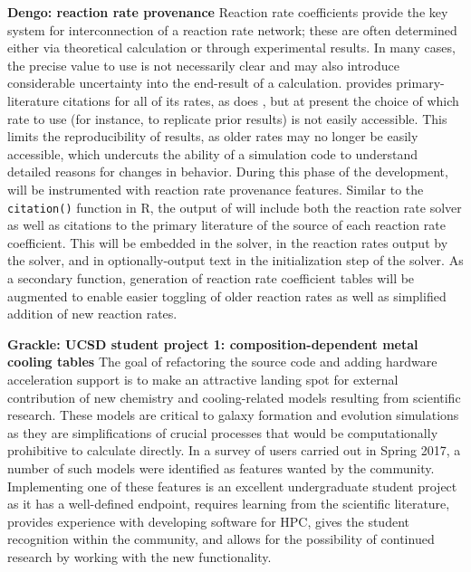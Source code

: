 \noindent \textbf{Dengo: reaction rate provenance}
Reaction rate coefficients provide the key system for interconnection of a
reaction rate network; these are often determined either via theoretical
calculation or through experimental results.  In many cases, the precise value
to use is not necessarily clear \citep[][see, e.g.,]{2011ApJ...726...55T} and
may also introduce considerable uncertainty into the end-result of a
calculation.  \grackle{} provides primary-literature citations for all of its
rates, as does \dengo{}, but at present the choice of which rate to use (for
instance, to replicate prior results) is not easily accessible.  This limits
the reproducibility of results, as older rates may no longer be easily
accessible, which undercuts the ability of a simulation code to understand
detailed reasons for changes in behavior.  During this phase of the
development, \dengo{} will be instrumented with reaction rate provenance
features.  Similar to the \texttt{citation()} function in R, the output of
\dengo{} will include both the reaction rate solver as well as citations to the
primary literature of the source of each reaction rate coefficient.  This will
be embedded in the solver, in the reaction rates output by the solver, and in
optionally-output text in the initialization step of the solver.  As a
secondary function,  generation of reaction rate coefficient tables
will be augmented to enable easier toggling of older reaction rates as well as
simplified addition of new reaction rates.

\noindent \textbf{Grackle: UCSD student project 1:
  composition-dependent metal cooling tables} The goal of refactoring
the \grackle{} source code and adding hardware acceleration support is
to make \grackle{} an attractive landing spot for external
contribution of new chemistry and cooling-related models resulting
from scientific research.
These models are critical to galaxy formation and evolution
simulations as they are simplifications of crucial processes that
would be computationally prohibitive to calculate directly.  
In a survey of \grackle{} users carried out in Spring 2017, a number
of such models were identified as features wanted by the community.
Implementing one of these features is an excellent undergraduate
student project as it has a well-defined endpoint, requires learning
from the scientific literature, provides experience with developing
software for HPC, gives the student recognition within the community,
and allows for the possibility of continued research by working with
the new functionality.

